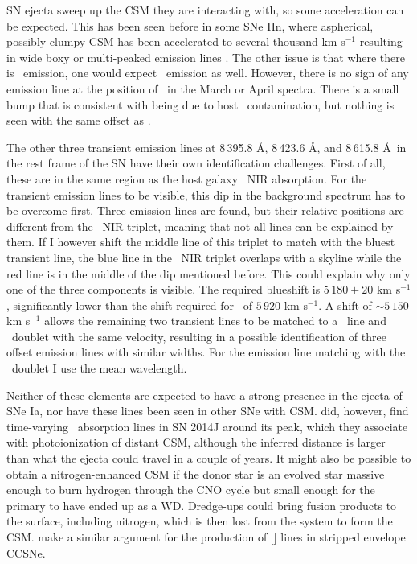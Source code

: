 \documentclass[a4paper,oneside,12pt, class=Latex/Classes/PhDthesisPSnPDF, crop=false]{standalone}
\begin{document}
SN ejecta sweep up the CSM they are interacting with, so some acceleration can be expected. This has been seen before in some SNe IIn, where aspherical, possibly clumpy CSM has been accelerated to several thousand km s$^{-1}$ resulting in wide boxy or multi-peaked emission lines \citep{1998S_aspherical_CSM, 1998S_late-time, PTF11iqb}. The other issue is that where there is \Hbeta\ emission, one would expect \Halpha\ emission as well. However, there is no sign of any emission line at the position of \Halpha\ in the March or April spectra. There is a small bump that is consistent with being due to host \Halpha\ contamination, but nothing is seen with the same offset as \Hbeta.

The other three transient emission lines at 8\,395.8 \AA, 8\,423.6 \AA, and 8\,615.8 \AA\ in the rest frame of the SN have their own identification challenges. First of all, these are in the same region as the host galaxy \CaII\ NIR absorption. For the transient emission lines to be visible, this dip in the background spectrum has to be overcome first. Three emission lines are found, but their relative positions are different from the \CaII\ NIR triplet, meaning that not all lines can be explained by them. If I however shift the middle line of this triplet to match with the bluest transient line, the blue line in the \CaII\ NIR triplet overlaps with a skyline while the red line is in the middle of the dip mentioned before. This could explain why only one of the three components is visible. The required blueshift is $5\,180\pm20$ km s$^{-1}$, significantly lower than the shift required for \Hbeta\ of $5\,920$ km s$^{-1}$. A shift of $\sim5\,150$ km s$^{-1}$ allows the remaining two transient lines to be matched to a \NI\ line and \KI\ doublet with the same velocity, resulting in a possible identification of three offset emission lines with similar widths. For the emission line matching with the \KI\ doublet I use the mean wavelength.

Neither of these elements are expected to have a strong presence in the ejecta of SNe Ia, nor have these lines been seen in other SNe with CSM. \citet{2014J_KI} did, however, find time-varying \KI\ absorption lines in SN 2014J around its peak, which they associate with photoionization of distant CSM, although the inferred distance is larger than what the ejecta could travel in a couple of years. It might also be possible to obtain a nitrogen-enhanced CSM if the donor star is an evolved star massive enough to burn hydrogen through the CNO cycle but small enough for the primary to have ended up as a WD. Dredge-ups could bring fusion products to the surface, including nitrogen, which is then lost from the system to form the CSM. \citet{N_lines_SECCSN} make a similar argument for the production of [\NII] lines in stripped envelope CCSNe.
\end{document}
